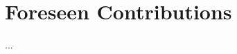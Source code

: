 \documentclass{article}
\begin{document}
\section{Foreseen Contributions}



...













\end{document}

